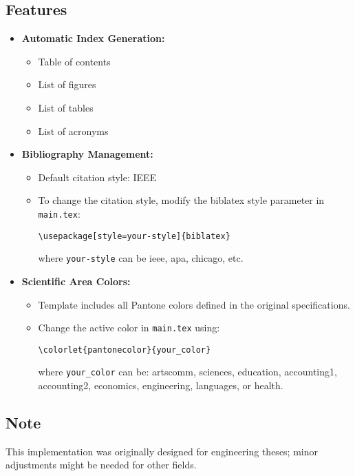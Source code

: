 \subsection{Features}
\begin{itemize}
    \item \textbf{Automatic Index Generation:}
    \begin{itemize}
        \item Table of contents
        \item List of figures
        \item List of tables
        \item List of acronyms
    \end{itemize}
    
    \item \textbf{Bibliography Management:}
    \begin{itemize}
        \item Default citation style: IEEE
        \item To change the citation style, modify the biblatex style parameter in \texttt{main.tex}:
        \begin{verbatim}
\usepackage[style=your-style]{biblatex}
        \end{verbatim}
        where \texttt{your-style} can be ieee, apa, chicago, etc.
    \end{itemize}
    
    \item \textbf{Scientific Area Colors:}
    \begin{itemize}
        \item Template includes all Pantone colors defined in the original specifications.
        \item Change the active color in \texttt{main.tex} using:
        \begin{verbatim}
\colorlet{pantonecolor}{your_color}
        \end{verbatim}
        where \texttt{your\_color} can be: artscomm, sciences, education, accounting1, accounting2, economics, engineering, languages, or health.
    \end{itemize}
\end{itemize}

\subsection{Note}
This implementation was originally designed for engineering theses; minor adjustments might be needed for other fields.